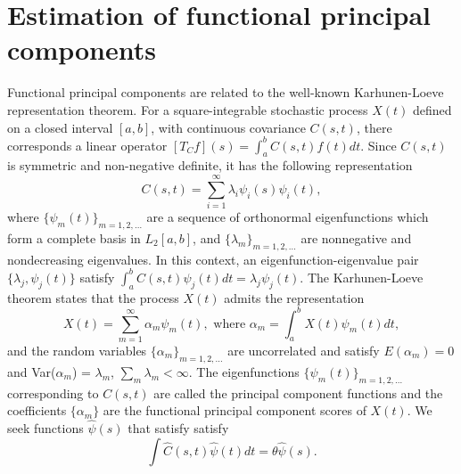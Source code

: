 \section{Estimation of functional principal components } \label{eigenfunctions}

Functional principal components are related to the well-known Karhunen-Loeve representation theorem.  For a square-integrable stochastic process $X(t)$ defined on a closed interval $[a,b]$,  with continuous covariance $C(s,t)$, there corresponds a linear operator $[T_Cf](s) = \int_a^bC(s,t)f(t)dt$. Since $C(s,t)$ is symmetric and non-negative definite, it has the following representation %
\begin{equation*} 
 C(s,t) = \sum_{i=1}^{\infty}\lambda_i\psi_i(s)\psi_i(t),
\end{equation*}
where  $\{\psi_m(t)\}_{m=1,2,\ldots}$ are a sequence of orthonormal eigenfunctions which form a complete basis in $L_2[a,b]$, and  $\{\lambda_m \}_{m=1,2,\ldots}$ are nonnegative and nondecreasing eigenvalues. In this context, an eigenfunction-eigenvalue pair $\{\lambda_j, \psi_j(t)\}$ satisfy $\int_a^bC(s,t)\psi_j(t)dt = \lambda_j\psi_j(t)$. The Karhunen-Loeve theorem states that the process $X(t)$ admits the representation
\begin{equation*}
X(t) =  \sum_{m=1}^{\infty}\alpha_m \psi_m(t), \mbox{ where  } \alpha_m = \int_a^b X(t) \psi_m(t)dt,
\end{equation*}
and the random variables $\{\alpha_m \}_{m=1,2,\ldots}$ are uncorrelated and satisfy $E(\alpha_m)=0$ and Var($\alpha_m$) = $\lambda_m$, $\sum_m \lambda_m < \infty$. The eigenfunctions $\{\psi_m(t)\}_{m=1,2,\ldots}$ corresponding to $C(s,t)$ are called the principal component functions and the coefficients  $\{\alpha_m \}$ are the functional principal component scores of $X(t)$. We seek functions $\hat{\psi}(s)$ that satisfy satisfy
\begin{equation} \label{eq:eigenfuns}
\int \hat{C}(s,t)\hat{\psi}(t)dt=\theta\hat{\psi}(s).
\end{equation}

